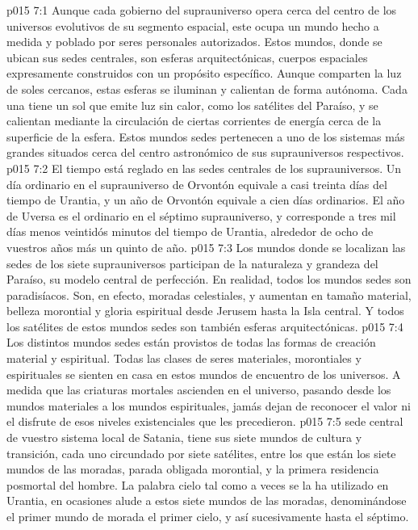 \vs p015 7:1 Aunque cada gobierno del suprauniverso opera cerca del centro de los universos evolutivos de su segmento espacial, este ocupa un mundo hecho a medida y poblado por seres personales autorizados. Estos mundos, donde se ubican sus sedes centrales, son esferas arquitectónicas, cuerpos espaciales expresamente construidos con un propósito específico. Aunque comparten la luz de soles cercanos, estas esferas se iluminan y calientan de forma autónoma. Cada una tiene un sol que emite luz sin calor, como los satélites del Paraíso, y se calientan mediante la circulación de ciertas corrientes de energía cerca de la superficie de la esfera. Estos mundos sedes pertenecen a uno de los sistemas más grandes situados cerca del centro astronómico de sus suprauniversos respectivos.
\vs p015 7:2 \pc El tiempo está reglado en las sedes centrales de los suprauniversos. Un día ordinario en el suprauniverso de Orvontón equivale a casi treinta días del tiempo de Urantia, y un año de Orvontón equivale a cien días ordinarios. El año de Uversa es el ordinario en el séptimo suprauniverso, y corresponde a tres mil días menos veintidós minutos del tiempo de Urantia, alrededor de ocho de vuestros años más un quinto de año.
\vs p015 7:3 \pc Los mundos donde se localizan las sedes de los siete suprauniversos participan de la naturaleza y grandeza del Paraíso, su modelo central de perfección. En realidad, todos los mundos sedes son paradisíacos. Son, en efecto, moradas celestiales, y aumentan en tamaño material, belleza morontial y gloria espiritual desde Jerusem hasta la Isla central. Y todos los satélites de estos mundos sedes son también esferas arquitectónicas.
\vs p015 7:4 Los distintos mundos sedes están provistos de todas las formas de creación material y espiritual. Todas las clases de seres materiales, morontiales y espirituales se sienten en casa en estos mundos de encuentro de los universos. A medida que las criaturas mortales ascienden en el universo, pasando desde los mundos materiales a los mundos espirituales, jamás dejan de reconocer el valor ni el disfrute de esos niveles existenciales que les precedieron.
\vs p015 7:5 \pc {} sede central de vuestro sistema local de Satania, tiene sus siete mundos de cultura y transición, cada uno circundado por siete satélites, entre los que están los siete mundos de las moradas, parada obligada morontial, y la primera residencia posmortal del hombre. La palabra cielo tal como a veces se la ha utilizado en Urantia, en ocasiones alude a estos siete mundos de las moradas, denominándose el primer mundo de morada el primer cielo, y así sucesivamente hasta el séptimo.
